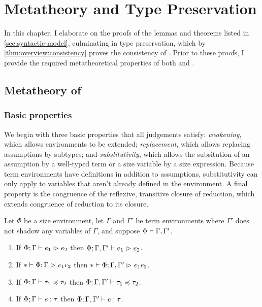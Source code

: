 \chapter{Metatheory and Type Preservation} \label{ch:proofs}



In this chapter, I elaborate on the proofs of the lemmas and theorems listed in \cref{sec:syntactic-model},
culminating in type preservation, which by \cref{thm:overview:consistency} proves the consistency of \lang.
Prior to these proofs, I provide the required metatheoretical properties of both \lang and \CICE.

\section{Metatheory of \lang}

\subsection{Basic properties}

We begin with three basic properties that all judgements satisfy:
\emph{weakening}, which allows environments to be extended;
\emph{replacement}, which allows replacing assumptions by subtypes;
and \emph{substitutivity}, which allows the subsitution of an assumption by a well-typed term
or a size variable by a size expression.
Because term environments have definitions in addition to assumptions,
substitutivity can only apply to variables that aren't already defined in the environment.
A final property is the congruence of the reflexive, transitive closure of reduction,
which extends congruence of reduction to its closure.

\begin{lemma}[Weakening] \label{lem:weakening}
Let $\Phi$ be a size environment,
let $\Gamma$ and $\Gamma'$ be term environments
where $\Gamma'$ does not shadow any variables of $\Gamma$,
and suppose $\Phi \mathrel{\vdash} \Gamma, \Gamma'$.
\begin{enumerate}[noitemsep]
  \item \label{item:weakening:red} If $\Phi; \Gamma \mathrel{\vdash} e_1 \mathrel{\rhd}_{} e_2$ then $\Phi; \Gamma, \Gamma' \mathrel{\vdash} e_1 \mathrel{\rhd}_{} e_2$.
  \item \label{item:weakening:red*} If $* \mathrel{\vdash} \Phi; \Gamma \mathrel{\rhd}_{} e_1{e_2}$ then $* \mathrel{\vdash} \Phi; \Gamma, \Gamma' \mathrel{\rhd}_{} e_1{e_2}$.
  \item \label{item:weakening:subtype} If $\Phi; \Gamma \mathrel{\vdash} \tau_1 \mathrel{\preccurlyeq} \tau_2$ then $\Phi; \Gamma, \Gamma' \mathrel{\vdash} \tau_1 \mathrel{\preccurlyeq} \tau_2$.
  \item If $\Phi; \Gamma \mathrel{\vdash} e \mathrel{:} \tau$ then $\Phi; \Gamma, \Gamma' \mathrel{\vdash} e \mathrel{:} \tau$.
\end{enumerate}
\end{lemma}

